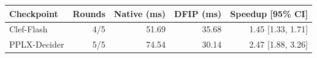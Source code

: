 \begin{tabular}{lrrrr}
\toprule
Checkpoint & Rounds & Native (ms) & DFIP (ms) & Speedup [95\% CI] \\
\midrule
Clef-Flash & 4/5 & 51.69 & 35.68 & 1.45 [1.33, 1.71] \\
PPLX-Decider & 5/5 & 74.54 & 30.14 & 2.47 [1.88, 3.26] \\
\bottomrule
\end{tabular}
